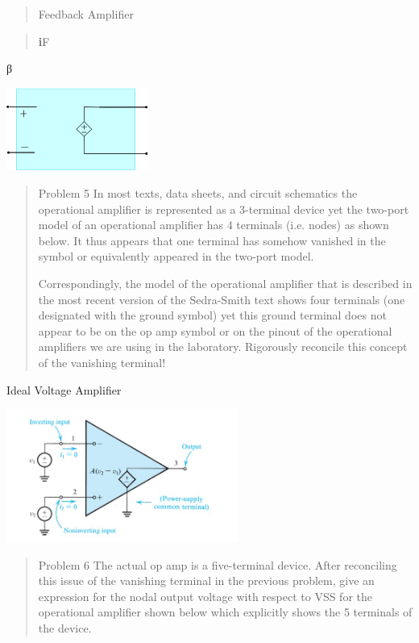 \documentclass[10pt,a4paper]{article}
\begin{document}
\begin{quote}
Feedback Amplifier
\end{quote}



\begin{quote}
\textbf{i}F
\end{quote}

β

\includegraphics[width=1.83333in,height=1.06944in]{vertopal_3376d9a0695b4078a59040ba2f51c60d/media/image7.png}

\begin{quote}
Problem 5 In most texts, data sheets, and circuit schematics the
operational amplifier is represented as a 3-terminal device yet the
two-port model of an operational amplifier has 4 terminals (i.e. nodes)
as shown below. It thus appears that one terminal has somehow vanished
in the symbol or equivalently appeared in the two-port model.

Correspondingly, the model of the operational amplifier that is
described in the most recent version of the Sedra-Smith text shows four
terminals (one designated with the ground symbol) yet this ground
terminal does not appear to be on the op amp symbol or on the pinout of
the operational amplifiers we are using in the laboratory. Rigorously
reconcile this concept of the vanishing terminal!
\end{quote}



Ideal Voltage Amplifier

\includegraphics[width=2.99028in,height=1.71667in]{vertopal_3376d9a0695b4078a59040ba2f51c60d/media/image5.png}

\begin{quote}
Problem 6 The actual op amp is a five-terminal device. After reconciling
this issue of the vanishing terminal in the previous problem, give an
expression for the nodal output voltage with respect to VSS for the
operational amplifier shown below which explicitly shows the 5 terminals
of the device.
\end{quote}
\end{document}
